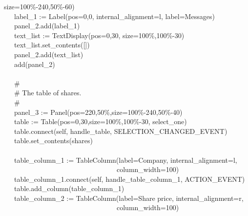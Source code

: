 {{\textquotedbl}size=100\%-240,50\%-60{\textquotedbl}) \\
\>   \ \ \ label\_1 := Label({\textquotedbl}pos=0,0{\textquotedbl},
{\textquotedbl}internal\_alignment=l{\textquotedbl},
{\textquotedbl}label=Messages{\textquotedbl}) \\
\>   \ \ \ panel\_2.add(label\_1) \\
\>   \ \ \ text\_list :=
TextDisplay({\textquotedbl}pos=0,30{\textquotedbl},
{\textquotedbl}size=100\%,100\%-30{\textquotedbl}) \\
\>   \ \ \ text\_list.set\_contents([]) \\
\>   \ \ \ panel\_2.add(text\_list) \\
\>   \ \ \ add(panel\_2) \\
\ \\
\>   \ \ \ \# \\
\>   \ \ \ \# The table of shares. \\
\>   \ \ \ \# \\
\>   \ \ \ panel\_3 :=
Panel({\textquotedbl}pos=220,50\%{\textquotedbl},{\textquotedbl}size=100\%-240,50\%-40{\textquotedbl}) \\
\>   \ \ \ table :=
Table({\textquotedbl}pos=0,30{\textquotedbl},{\textquotedbl}size=100\%,100\%-30{\textquotedbl},
{\textquotedbl}select\_one{\textquotedbl}) \\
\>   \ \ \ table.connect(self,
{\textquotedbl}handle\_table{\textquotedbl},
SELECTION\_CHANGED\_EVENT) \\
\>   \ \ \ table.set\_contents(shares) \\
\ \\
\>   \ \ \ table\_column\_1 :=
TableColumn({\textquotedbl}label=Company{\textquotedbl},
{\textquotedbl}internal\_alignment=l{\textquotedbl}, \\
\>   \ \ \ \ \ \ \ \ \ \ \ \ \ \ \ \ \ \ \ \ \ \ \ \ \ \ \ \ \ \ \ \ \ {\textquotedbl}column\_width=100{\textquotedbl}) \\
\>   \ \ \ table\_column\_1.connect(self,
{\textquotedbl}handle\_table\_column\_1{\textquotedbl}, ACTION\_EVENT) \\
\>   \ \ \ table.add\_column(table\_column\_1) \\
\>   \ \ \ table\_column\_2 := TableColumn({\textquotedbl}label=Share
price{\textquotedbl},
{\textquotedbl}internal\_alignment=r{\textquotedbl}, \\
\>   \ \ \ \ \ \ \ \ \ \ \ \ \ \ \ \ \ \ \ \ \ \ \ \ \ \ \ \ \ \ \ \ \ {\textquotedbl}column\_width=100{\textquotedbl}) \\
}
